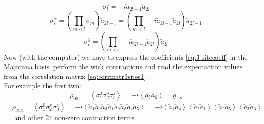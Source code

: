\documentclass[10pt,a4paper]{article}
\begin{document}
\begin{equation}
\sigma_{l}^{z} = -i\check{a}_{2l-1} \check{a}_{2 l} 
\end{equation}
\begin{equation}
\sigma_{l}^{x}= \left(\prod_{m<l} \sigma_{m}^{z}\right)\check{a}_{2l-1}=
\left(\prod_{m<l} -i\check{a}_{2l-1} \check{a}_{2 l}\right)\check{a}_{2l-1}
\end{equation}
\begin{equation}
\sigma_{l}^{y}=
\left(\prod_{m<l} -i\check{a}_{2l-1} \check{a}_{2 l}\right)\check{a}_{2l}
\end{equation}
Now (with the computer) we have to express the coefficients \ref{eq:3-sitecoeff} in the Majorana basis, perform the wick contractions and read the expectaction values from the correlation matrix \ref{eq:corrmatr3sites1}.\\
For example the first two:\\
\begin{equation}
\rho_{00z}=\left\langle\sigma_{1}^{0}\sigma_{2}^{0} \sigma_{3}^{z}\right\rangle=-i\left\langle\check{a}_{5} \check{a}_{6}\right\rangle=g_{-2}
\end{equation} 
\begin{equation}\begin{aligned}\label{eq:esempiol3}
&\rho_{0xx}=\left\langle\sigma_{1}^{0}\sigma_{2}^{x} \sigma_{3}^{x}\right\rangle=-i\left\langle\check{a}_1
\check{a}_2
\check{a}_3
\check{a}_1
\check{a}_2
\check{a}_3
\check{a}_4
\check{a}_5\right\rangle=-i\left\langle\check{a}_1
\check{a}_4\right\rangle\left\langle
\check{a}_2
\check{a}_1\right\rangle\left\langle
\check{a}_2
\check{a}_5\right\rangle\left\langle
\check{a}_3
\check{a}_3 \right\rangle \\ &\text{ and other 27 non-zero contraction terms}
\end{aligned}
\end{equation}
%
\end{document}
